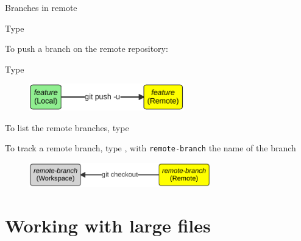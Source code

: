 \documentclass[10pt]{beamer}
\begin{document}
\begin{frame}[fragile]{Branches in remote}

Type 

To push a branch on the remote repository:

Type 

\begin{figure}[H]

{\centering \includegraphics[width=0.6\textwidth]{mermaid/diagrams-2.pdf}

}

\end{figure}

To list the remote branches, type 

To track a remote branch, type , with
\verb+remote-branch+ the name of the branch

\begin{figure}[H]

{\centering \includegraphics[width=0.7\textwidth]{mermaid/diagrams-3.pdf}

}

\end{figure}

\end{frame}







\section{Working with large files}
\end{document}
